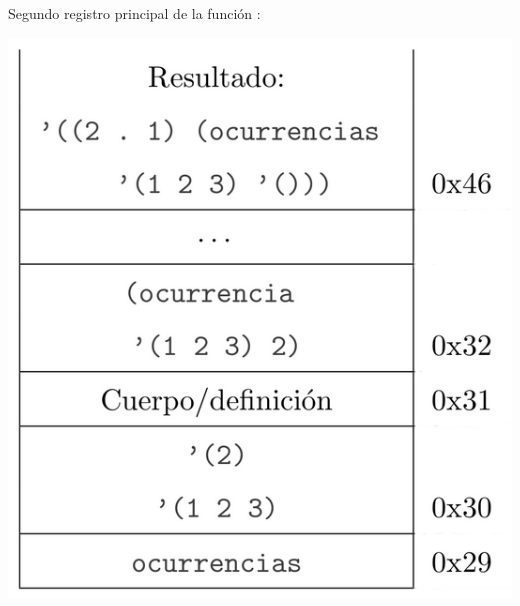 Segundo registro principal de la función :
\begin{center}
        \includegraphics[scale=0.40]{./R6}
\end{center}


